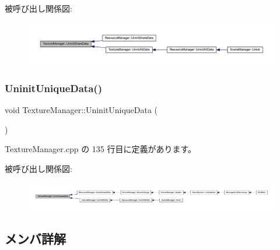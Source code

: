 被呼び出し関係図\+:
\nopagebreak
\begin{figure}[H]
\begin{center}
\leavevmode
\includegraphics[width=350pt]{class_texture_manager_a770b76a28bac4c20c16960f58a2d3b77_icgraph}
\end{center}
\end{figure}
\mbox{\label{class_texture_manager_a9d9dd61edf4153bd70ba830ae2dc62e8}} 
\subsubsection{\texorpdfstring{Uninit\+Unique\+Data()}{UninitUniqueData()}}
{\footnotesize\ttfamily void Texture\+Manager\+::\+Uninit\+Unique\+Data (\begin{DoxyParamCaption}{ }\end{DoxyParamCaption})\hspace{0.3cm}{\ttfamily [static]}}



 Texture\+Manager.\+cpp の 135 行目に定義があります。

被呼び出し関係図\+:
\nopagebreak
\begin{figure}[H]
\begin{center}
\leavevmode
\includegraphics[width=350pt]{class_texture_manager_a9d9dd61edf4153bd70ba830ae2dc62e8_icgraph}
\end{center}
\end{figure}


\subsection{メンバ詳解}
\mbox{\label{class_texture_manager_a7cdcbb47cf36d179ae88716210e7db65}} 
